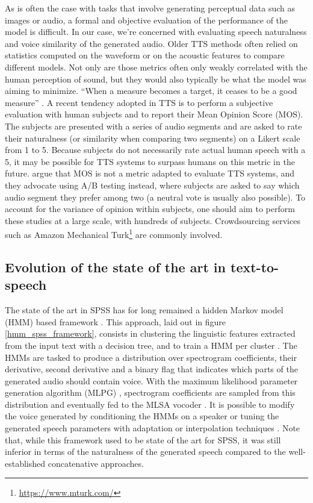 \documentclass[a4paper, oneside, 12pt, english]{article}
\begin{document}
As is often the case with tasks that involve generating perceptual data such as images or audio, a formal and objective evaluation of the performance of the model is difficult. In our case, we're concerned with evaluating speech naturalness and voice similarity of the generated audio. Older TTS methods often relied on statistics computed on the waveform or on the acoustic features to compare different models. Not only are those metrics often only weakly correlated with the human perception of sound, but they would also typically be what the model was aiming to minimize. ``When a measure becomes a target, it ceases to be a good measure'' \citep{WhenAMetric}. A recent tendency adopted in TTS is to perform a subjective evaluation with human subjects and to report their Mean Opinion Score (MOS). The subjects are presented with a series of audio segments and are asked to rate their naturalness (or similarity when comparing two segments) on a Likert scale from 1 to 5. Because subjects do not necessarily rate actual human speech with a 5, it may be possible for TTS systems to surpass humans on this metric in the future. \citep{MOSNaturalness} argue that MOS is not a metric adapted to evaluate TTS systems, and they advocate using A/B testing instead, where subjects are asked to say which audio segment they prefer among two (a neutral vote is usually also possible). To account for the variance of opinion within subjects, one should aim to perform these studies at a large scale, with hundreds of subjects. Crowdsourcing services such as Amazon Mechanical Turk\footnote{\url{https://www.mturk.com/}} are commonly involved. 



\subsection{Evolution of the state of the art in text-to-speech}
The state of the art in SPSS has for long remained a hidden Markov model (HMM) based framework \citep{Tokuda-2013}. This approach, laid out in figure \ref{hmm_spss_framework}, consists in clustering the linguistic features extracted from the input text with a decision tree, and to train a HMM per cluster \citep{HMMTTS}. The HMMs are tasked to produce a distribution over spectrogram coefficients, their derivative, second derivative and a binary flag that indicates which parts of the generated audio should contain voice. With the maximum likelihood parameter generation algorithm (MLPG) \citep{Tokuda-2000}, spectrogram coefficients are sampled from this distribution and eventually fed to the MLSA vocoder \citep{MLSA}. It is possible to modify the voice generated by conditioning the HMMs on a speaker or tuning the generated speech parameters with adaptation or interpolation techniques \citep{HMMSpeakerInterpolation}. Note that, while this framework used to be state of the art for SPSS, it was still inferior in terms of the naturalness of the generated speech compared to the well-established concatenative approaches.
\end{document}
